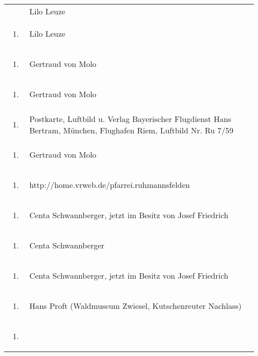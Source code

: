 \documentclass[a4paper]{article}
\begin{document}
\begin{flushleft}
\begin{supertabular}{m{1.2409999cm}m{14.604cm}}
 &
Lilo Leuze\\
\begin{enumerate}
\item 
\end{enumerate}
 &
Lilo Leuze\\
\begin{enumerate}
\item 
\end{enumerate}
 &
Gertraud von Molo\\
\begin{enumerate}
\item 
\end{enumerate}
 &
Gertraud von Molo\\
\begin{enumerate}
\item 
\end{enumerate}
 &
Postkarte, Luftbild u. Verlag Bayerischer Flugdienst Hans Bertram,
München, Flughafen Riem, Luftbild Nr. Ru 7/59\\
\begin{enumerate}
\item 
\end{enumerate}
 &
Gertraud von Molo\\
\begin{enumerate}
\item 
\end{enumerate}
 &
http://home.vrweb.de/pfarrei.ruhmannsfelden\\
\begin{enumerate}
\item 
\end{enumerate}
 &
Centa Schwannberger, jetzt im Besitz von Josef Friedrich\\
\begin{enumerate}
\item 
\end{enumerate}
 &
Centa Schwannberger\\
\begin{enumerate}
\item 
\end{enumerate}
 &
Centa Schwannberger, jetzt im Besitz von Josef Friedrich\\
\begin{enumerate}
\item 
\end{enumerate}
 &
Hans Proft (Waldmuseum Zwiesel, Kutschenreuter Nachlass)\\
\begin{enumerate}
\item 

\end{enumerate}
\end{supertabular}
\end{flushleft}
\end{document}
